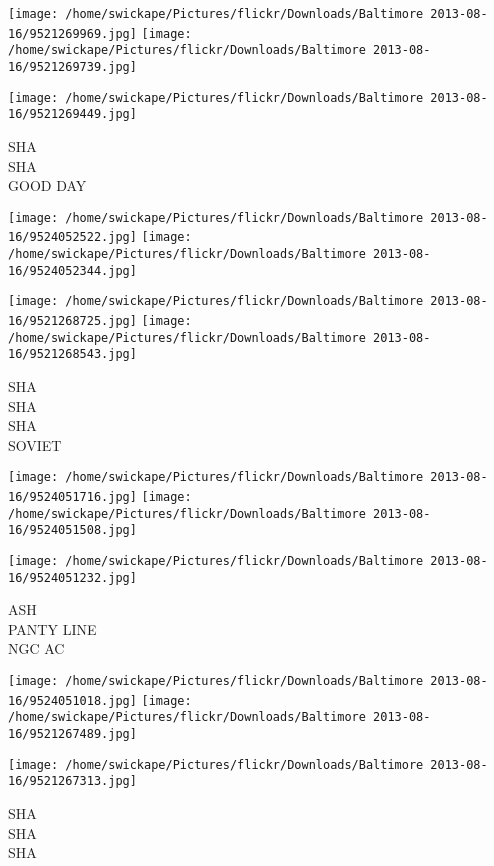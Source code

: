 \documentclass[10pt,letterpaper]{article}
\begin{document}
\texttt{[image: /home/swickape/Pictures/flickr/Downloads/Baltimore 2013-08-16/9521269969.jpg]}
\texttt{[image: /home/swickape/Pictures/flickr/Downloads/Baltimore 2013-08-16/9521269739.jpg]}

\vspace{0.25in}
\texttt{[image: /home/swickape/Pictures/flickr/Downloads/Baltimore 2013-08-16/9521269449.jpg]}

SHA\\
SHA\\
GOOD DAY\\
\pagebreak

\texttt{[image: /home/swickape/Pictures/flickr/Downloads/Baltimore 2013-08-16/9524052522.jpg]}
\texttt{[image: /home/swickape/Pictures/flickr/Downloads/Baltimore 2013-08-16/9524052344.jpg]}

\texttt{[image: /home/swickape/Pictures/flickr/Downloads/Baltimore 2013-08-16/9521268725.jpg]}
\texttt{[image: /home/swickape/Pictures/flickr/Downloads/Baltimore 2013-08-16/9521268543.jpg]}

SHA\\
SHA\\
SHA\\
SOVIET\\
\pagebreak

\texttt{[image: /home/swickape/Pictures/flickr/Downloads/Baltimore 2013-08-16/9524051716.jpg]}
\texttt{[image: /home/swickape/Pictures/flickr/Downloads/Baltimore 2013-08-16/9524051508.jpg]}

\vspace{0.25in}
\texttt{[image: /home/swickape/Pictures/flickr/Downloads/Baltimore 2013-08-16/9524051232.jpg]}

ASH\\
PANTY LINE\\
NGC AC\\
\pagebreak

\texttt{[image: /home/swickape/Pictures/flickr/Downloads/Baltimore 2013-08-16/9524051018.jpg]}
\texttt{[image: /home/swickape/Pictures/flickr/Downloads/Baltimore 2013-08-16/9521267489.jpg]}

\texttt{[image: /home/swickape/Pictures/flickr/Downloads/Baltimore 2013-08-16/9521267313.jpg]}

SHA\\
SHA\\
SHA\\
\pagebreak
\end{document}
